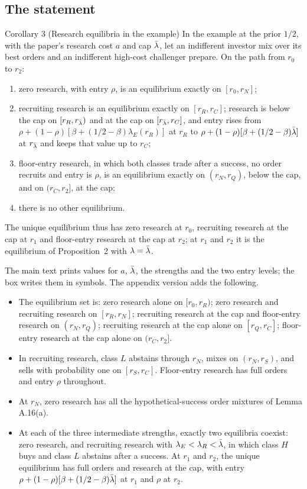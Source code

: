 \subsection{The statement}

\begin{paperresult}{Corollary 3 (Research equilibria in the example)}
In the example at the prior \(1/2\), with the paper's research cost \(a\) and cap \(\bar\lambda\), let an indifferent investor
mix over its best orders and an indifferent high-cost challenger prepare. On the path from \(r_0\) to \(r_2\):
\begin{enumerate}[label=(\roman*),leftmargin=2em]
\item zero research, with entry \(\rho\), is an equilibrium exactly on \([r_0,r_N]\);
\item recruiting research is an equilibrium exactly on \([r_R,r_C]\); research is below the cap on \([r_R,r_{\bar\lambda})\) and
at the cap on \([r_{\bar\lambda},r_C]\), and entry rises from \(\rho+(1-\rho)[\beta+(1/2-\beta)\lambda_E(r_R)]\) at \(r_R\) to
\(\rho+(1-\rho)[\beta+(1/2-\beta)\bar\lambda]\) at \(r_{\bar\lambda}\) and keeps that value up to \(r_C\);
\item floor-entry research, in which both classes trade after a success, no order recruits and entry is \(\rho\), is an
equilibrium exactly on \((r_N,r_Q)\), below the cap, and on \((r_C,r_2]\), at the cap;
\item there is no other equilibrium.
\end{enumerate}
The unique equilibrium thus has zero research at \(r_0\), recruiting research at the cap at \(r_1\) and floor-entry
research at the cap at \(r_2\); at \(r_1\) and \(r_2\) it is the equilibrium of Proposition~2 with \(\lambda=\bar\lambda\).
\end{paperresult}

The main text prints values for \(a\), \(\bar\lambda\), the strengths and the two entry levels; the box writes them in symbols.
The appendix version adds the following.
\begin{itemize}
\item The equilibrium set is: zero research alone on \([r_0,r_R)\); zero research and recruiting research on
\([r_R,r_N]\); recruiting research at the cap and floor-entry research on \((r_N,r_Q)\); recruiting research at the cap
alone on \([r_Q,r_C]\); floor-entry research at the cap alone on \((r_C,r_2]\).
\item In recruiting research, class \(L\) abstains through \(r_N\), mixes on \((r_N,r_S)\), and sells with probability
one on \([r_S,r_C]\). Floor-entry research has full orders and entry \(\rho\) throughout.
\item At \(r_N\), zero research has all the hypothetical-success order mixtures of Lemma A.16(a).
\item At each of the three intermediate strengths, exactly two equilibria coexist: zero research, and recruiting
research with \(\lambda_E<\lambda_R<\bar\lambda\), in which class \(H\) buys and class \(L\) abstains after a success. At
\(r_1\) and \(r_2\), the unique equilibrium has full orders and research at the cap, with entry
\(\rho+(1-\rho)[\beta+(1/2-\beta)\bar\lambda]\) at \(r_1\) and \(\rho\) at \(r_2\).
\end{itemize}


